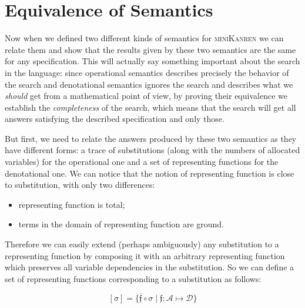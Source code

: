 \section{Equivalence of Semantics}
\label{equivalence}

Now when we defined two different kinds of semantics for \textsc{miniKanren} we can relate them and show that the results given by these two semantics are the same for any specification.
This will actually say something important about the search in the language: since operational semantics describes precisely the behavior of the search and denotational semantics
ignores the search and describes what we \emph{should} get from a mathematical point of view, by proving their equivalence we establish the \emph{completeness} of the search, which
means that the search will get all answers satisfying the described specification and only those.

But first, we need to relate the answers produced by these two semantics as they have different forms: a trace of substitutions (along with the numbers of allocated variables)
for the operational one and a set of representing functions for the denotational one. We can notice that the notion of representing function is close to substitution, with only two differences:

\begin{itemize}
\item representing function is total;
\item terms in the domain of representing function are ground.
\end{itemize}

Therefore we can easily extend (perhaps ambiguously) any substitution to a representing function by composing it with an arbitrary representing function which preserves
all variable dependencies in the substitution. So we can define a set of representing functions corresponding to a substitution as follows:

\[
[\sigma] = \{\overline{\mathfrak f} \circ \sigma \mid \mathfrak{f}:\mathcal{A}\mapsto\mathcal{D}\}
\]

\begin{comment}
In \textsc{Coq} this notion boils down to the following definition:

\begin{lstlisting}[language=Coq]
   Definition in_denotational_sem_subst
     (s : subst) (f : repr_fun) : Prop :=
       exists (f' : repr_fun),
         repr_fun_eq (subst_repr_fun_compose s f') f.
\end{lstlisting}

where ``\lstinline[language=Coq]|repr_fun_eq|'' stands for representing functions extensional equality, ``\lstinline[language=Coq]|subst_repr_fun_compose|''~---
for a composition of a substitution and a representing function.
\end{comment}

